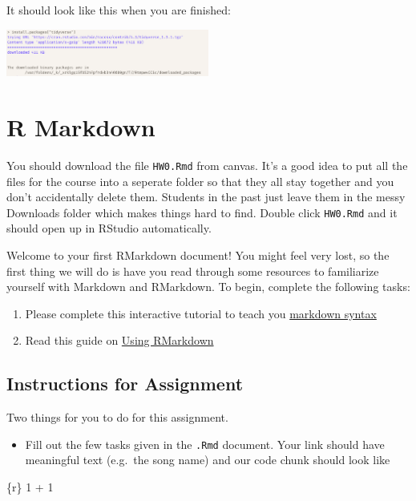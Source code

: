 \documentclass[12pt]{article}
\newenvironment{Shaded}{\begin{snugshade}}{\end{snugshade}}
\newcommand{\AttributeTok}[1]{\textcolor[rgb]{0.40,0.45,0.13}{#1}}
\newcommand{\StringTok}[1]{\textcolor[rgb]{0.13,0.47,0.30}{#1}}
\providecommand{\tightlist}{%
  \setlength{\itemsep}{0pt}\setlength{\parskip}{0pt}}\usepackage{longtable,booktabs,array}
\begin{document}
It should look like this when you are finished:

\includegraphics[width=0.5\textwidth,height=\textheight]{R-installed.png}

\section{R Markdown}\label{r-markdown}

You should download the file \texttt{HW0.Rmd} from canvas. It's a good
idea to put all the files for the course into a seperate folder so that
they all stay together and you don't accidentally delete them. Students
in the past just leave them in the messy Downloads folder which makes
things hard to find. Double click \texttt{HW0.Rmd} and it should open up
in RStudio automatically.

Welcome to your first RMarkdown document! You might feel very lost, so
the first thing we will do is have you read through some resources to
familiarize yourself with Markdown and RMarkdown. To begin, complete the
following tasks:

\begin{enumerate}
\def\labelenumi{\arabic{enumi}.}
\item
  Please complete this interactive tutorial to teach you
  \href{https://www.markdowntutorial.com/}{markdown syntax}
\item
  Read this guide on
  \href{https://evalf21.classes.andrewheiss.com/resource/rmarkdown/}{Using
  RMarkdown}
\end{enumerate}

\subsection{Instructions for
Assignment}\label{instructions-for-assignment}

Two things for you to do for this assignment.

\begin{itemize}
\tightlist
\item
  Fill out the few tasks given in the \texttt{.Rmd} document. Your link
  should have meaningful text (e.g.~the song name) and our code chunk
  should look like
\end{itemize}

\begin{Shaded}
\begin{Highlighting}[]
\StringTok{\textasciigrave{}\textasciigrave{}\textasciigrave{}}\AttributeTok{\{r\}}
\AttributeTok{1 + 1}
\StringTok{\textasciigrave{}\textasciigrave{}\textasciigrave{}}
\end{Highlighting}
\end{Shaded}
\end{document}
